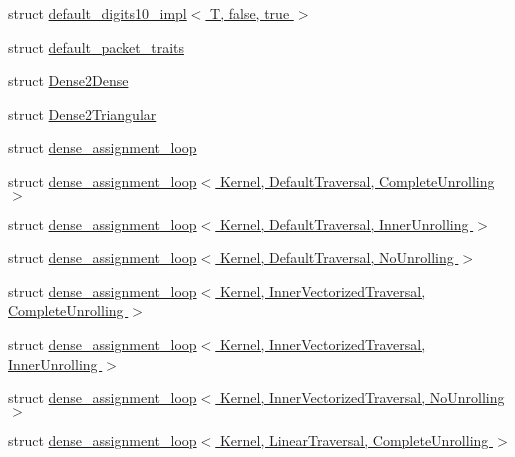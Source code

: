 \begin{DoxyCompactItemize}
\item 
struct \hyperlink{struct_eigen_1_1internal_1_1default__digits10__impl_3_01_t_00_01false_00_01true_01_4}{default\+\_\+digits10\+\_\+impl$<$ T, false, true $>$}
\item 
struct \hyperlink{struct_eigen_1_1internal_1_1default__packet__traits}{default\+\_\+packet\+\_\+traits}
\item 
struct \hyperlink{struct_eigen_1_1internal_1_1_dense2_dense}{Dense2\+Dense}
\item 
struct \hyperlink{struct_eigen_1_1internal_1_1_dense2_triangular}{Dense2\+Triangular}
\item 
struct \hyperlink{struct_eigen_1_1internal_1_1dense__assignment__loop}{dense\+\_\+assignment\+\_\+loop}
\item 
struct \hyperlink{struct_eigen_1_1internal_1_1dense__assignment__loop_3_01_kernel_00_01_default_traversal_00_01_complete_unrolling_01_4}{dense\+\_\+assignment\+\_\+loop$<$ Kernel, Default\+Traversal, Complete\+Unrolling $>$}
\item 
struct \hyperlink{struct_eigen_1_1internal_1_1dense__assignment__loop_3_01_kernel_00_01_default_traversal_00_01_inner_unrolling_01_4}{dense\+\_\+assignment\+\_\+loop$<$ Kernel, Default\+Traversal, Inner\+Unrolling $>$}
\item 
struct \hyperlink{struct_eigen_1_1internal_1_1dense__assignment__loop_3_01_kernel_00_01_default_traversal_00_01_no_unrolling_01_4}{dense\+\_\+assignment\+\_\+loop$<$ Kernel, Default\+Traversal, No\+Unrolling $>$}
\item 
struct \hyperlink{struct_eigen_1_1internal_1_1dense__assignment__loop_3_01_kernel_00_01_inner_vectorized_traversal_00_01_complete_unrolling_01_4}{dense\+\_\+assignment\+\_\+loop$<$ Kernel, Inner\+Vectorized\+Traversal, Complete\+Unrolling $>$}
\item 
struct \hyperlink{struct_eigen_1_1internal_1_1dense__assignment__loop_3_01_kernel_00_01_inner_vectorized_traversal_00_01_inner_unrolling_01_4}{dense\+\_\+assignment\+\_\+loop$<$ Kernel, Inner\+Vectorized\+Traversal, Inner\+Unrolling $>$}
\item 
struct \hyperlink{struct_eigen_1_1internal_1_1dense__assignment__loop_3_01_kernel_00_01_inner_vectorized_traversal_00_01_no_unrolling_01_4}{dense\+\_\+assignment\+\_\+loop$<$ Kernel, Inner\+Vectorized\+Traversal, No\+Unrolling $>$}
\item 
struct \hyperlink{struct_eigen_1_1internal_1_1dense__assignment__loop_3_01_kernel_00_01_linear_traversal_00_01_complete_unrolling_01_4}{dense\+\_\+assignment\+\_\+loop$<$ Kernel, Linear\+Traversal, Complete\+Unrolling $>$}

\end{DoxyCompactItemize}
